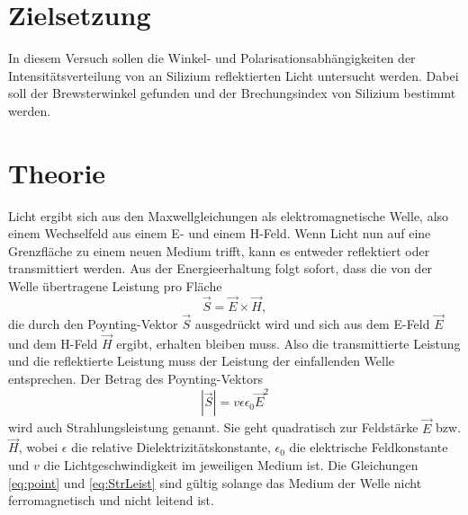 \section{Zielsetzung}
In diesem Versuch sollen die Winkel- und Polarisationsabhängigkeiten der Intensitätsverteilung
von an Silizium reflektierten Licht untersucht werden. Dabei soll der Brewsterwinkel gefunden und
der Brechungsindex von Silizium bestimmt werden.
\section{Theorie}
\label{sec:Theorie}
Licht ergibt sich aus den Maxwellgleichungen als elektromagnetische
Welle, also einem Wechselfeld aus einem E- und einem H-Feld. Wenn Licht nun auf eine
Grenzfläche zu einem neuen Medium trifft, kann es entweder reflektiert oder transmittiert werden.
Aus der Energieerhaltung folgt sofort, dass die von der Welle übertragene Leistung pro Fläche
\begin{equation}
    \vec{S}=\vec{E} \times \vec{H},
    \label{eq:point}
\end{equation}
die durch den Poynting-Vektor $\vec{S}$ ausgedrückt wird und sich aus dem E-Feld $\vec{E}$ und dem H-Feld
$\vec{H}$ ergibt, erhalten bleiben muss. Also die transmittierte Leistung und die reflektierte Leistung
muss der Leistung der einfallenden Welle entsprechen. Der Betrag des Poynting-Vektors
\begin{equation}
    \left|\vec{S}\right|=v\epsilon \epsilon_0 \vec{E}^2
    \label{eq:StrLeist}
\end{equation}
wird auch Strahlungsleistung genannt. Sie geht quadratisch zur Feldstärke $\vec{E}$ bzw. $\vec{H}$, wobei
$\epsilon$ die relative Dielektrizitätskonstante, $\epsilon_0$ die elektrische Feldkonstante und $v$ die Lichtgeschwindigkeit im jeweiligen Medium ist.
Die Gleichungen \eqref{eq:point} und \eqref{eq:StrLeist} sind gültig solange das Medium der Welle nicht ferromagnetisch und
nicht leitend ist.


